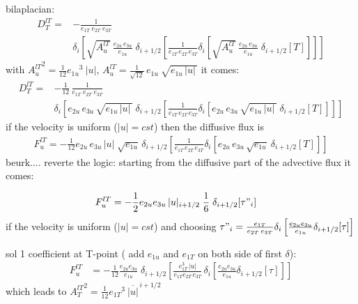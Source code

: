\documentclass[../main/NEMO_manual]{subfiles}
\begin{document}
bilaplacian:
\begin{equation}
  \label{eq:tra_ldf_lap}
  \begin{split}
    D_T^{lT} =&-\frac{1}{e_{1T} \; e_{2T}\;  e_{3T}} \\
    & \delta_i \left[  \sqrt{A_u^{lT}}\ \frac{e_{2u}\,e_{3u}}{e_{1u}}\;\delta_{i+1/2}
      \left[ \frac{1}{e_{1T}\,e_{2T}\, e_{3T}}
        \delta_i \left[ \sqrt{A_u^{lT}}\ \frac{e_{2u}\,e_{3u}}{e_{1u}}\;\delta_{i+1/2}
          [T] \right] \right] \right]
  \end{split}
\end{equation}
with ${A_u^{lT}}^2 = \frac{1}{12} {e_{1u}}^3\ |u|$, 
\ie $A_u^{lT} = \frac{1}{\sqrt{12}} \,e_{1u}\ \sqrt{ e_{1u}\,|u|\,}$
it comes:
\begin{equation}
  \label{eq:tra_ldf_lap}
  \begin{split}
    D_T^{lT} =&-\frac{1}{12}\,\frac{1}{e_{1T} \; e_{2T}\;  e_{3T}} \\
    & \delta_i \left[ e_{2u}\,e_{3u}\,\sqrt{ e_{1u}\,|u|\,}\;\delta_{i+1/2}
      \left[ \frac{1}{e_{1T}\,e_{2T}\, e_{3T}}
        \delta_i \left[ e_{2u}\,e_{3u}\,\sqrt{ e_{1u}\,|u|\,}\;\delta_{i+1/2}
          [T] \right] \right] \right]
  \end{split}
\end{equation}
if the velocity is uniform (\ie $|u|=cst$) then the diffusive flux is
\begin{equation}
  \label{eq:tra_ldf_lap}
  \begin{split}
    F_u^{lT} = - \frac{1}{12}
    e_{2u}\,e_{3u}\,|u| \;\sqrt{ e_{1u}}\,\delta_{i+1/2}
    \left[ \frac{1}{e_{1T}\,e_{2T}\, e_{3T}}
      \delta_i \left[ e_{2u}\,e_{3u}\,\sqrt{ e_{1u}}\:\delta_{i+1/2}
        [T] \right] \right]
  \end{split}
\end{equation}
beurk....  reverte the logic: starting from the diffusive part of the advective flux it comes:

\begin{equation}
  \label{eq:tra_adv_ubs2}
  \begin{split}
    F_u^{lT} &= - \frac{1}{2} e_{2u} e_{3u}\,|u|_{i+1/2} \;\frac{1}{6} \;\delta_{i+1/2}[\tau"_i]
  \end{split}
\end{equation}
if the velocity is uniform (\ie $|u|=cst$) and
choosing $\tau "_i =\frac{e_{1T}}{e_{2T}\,e_{3T}}\delta_i \left[ \frac{e_{2u} e_{3u} }{e_{1u} } \delta_{i+1/2}[\tau] \right]$

sol 1 coefficient at T-point ( add $e_{1u}$ and $e_{1T}$ on both side of first $\delta$):
\begin{equation}
  \label{eq:tra_adv_ubs2}
  \begin{split}
    F_u^{lT} &= - \frac{1}{12} \frac{e_{2u} e_{3u}}{e_{1u}}\;\delta_{i+1/2}\left[ \frac{e_{1T}^3\,|u|}{e_{1T}e_{2T}\,e_{3T}}\,\delta_i \left[ \frac{e_{2u} e_{3u} }{e_{1u} } \delta_{i+1/2}[\tau] \right] \right]
  \end{split}
\end{equation}
which leads to ${A_T^{lT}}^2 = \frac{1}{12} {e_{1T}}^3\ \overline{|u|}^{\,i+1/2}$
\end{document}
